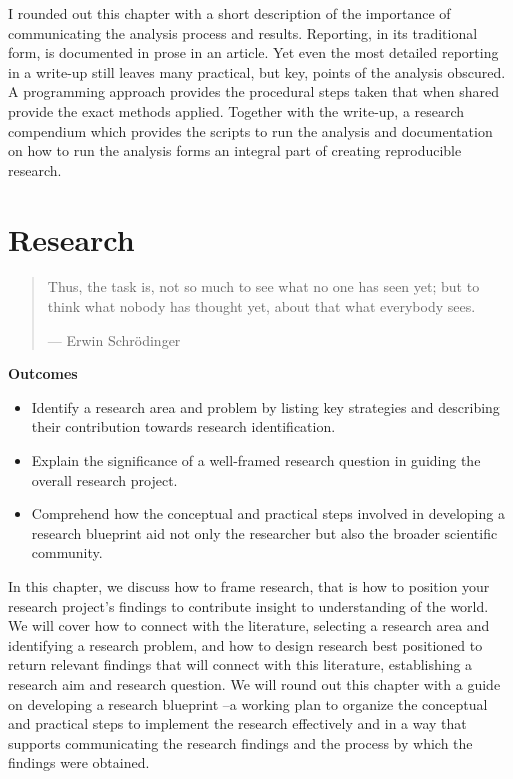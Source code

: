 \documentclass[
  letterpaper,
]{latex/krantz}
\providecommand{\tightlist}{%
  \setlength{\itemsep}{0pt}\setlength{\parskip}{0pt}}\usepackage{longtable,booktabs,array}
\theoremstyle{definition}
\theoremstyle{remark}
\begin{document}
I rounded out this chapter with a short description of the importance of
communicating the analysis process and results. Reporting, in its
traditional form, is documented in prose in an article. Yet even the
most detailed reporting in a write-up still leaves many practical, but
key, points of the analysis obscured. A programming approach provides
the procedural steps taken that when shared provide the exact methods
applied. Together with the write-up, a research compendium which
provides the scripts to run the analysis and documentation on how to run
the analysis forms an integral part of creating reproducible research.

\chapter{Research}\label{sec-research-chapter}

\begin{quote}
Thus, the task is, not so much to see what no one has seen yet; but to
think what nobody has thought yet, about that what everybody sees.

--- Erwin Schrödinger
\end{quote}

\begin{tcolorbox}[enhanced jigsaw, colframe=quarto-callout-color-frame, breakable, bottomrule=.15mm, arc=.35mm, left=2mm, opacityback=0, rightrule=.15mm, colback=white, toprule=.15mm, leftrule=.75mm]

\textbf{ Outcomes}

\begin{itemize}
\tightlist
\item
  Identify a research area and problem by listing key strategies and
  describing their contribution towards research identification.
\item
  Explain the significance of a well-framed research question in guiding
  the overall research project.
\item
  Comprehend how the conceptual and practical steps involved in
  developing a research blueprint aid not only the researcher but also
  the broader scientific community.
\end{itemize}

\end{tcolorbox}

In this chapter, we discuss how to frame research, that is how to
position your research project's findings to contribute insight to
understanding of the world. We will cover how to connect with the
literature, selecting a research area and identifying a research
problem, and how to design research best positioned to return relevant
findings that will connect with this literature, establishing a research
aim and research question. We will round out this chapter with a guide
on developing a research blueprint --a working plan to organize the
conceptual and practical steps to implement the research effectively and
in a way that supports communicating the research findings and the
process by which the findings were obtained.
\end{document}
